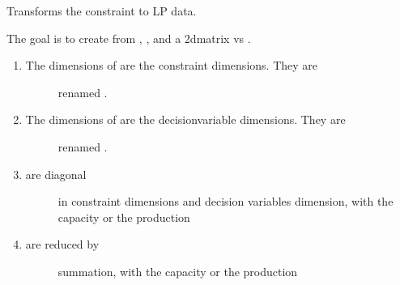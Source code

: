 \documentclass[letterpaper,10pt,english]{sphinxmanual}
\begin{document}
\begin{fulllineitems}
\label{\detokenize{api:muse.constraints.lp_constraint}}
Transforms the constraint to LP data.

The goal is to create from , , and
 a 2d\sphinxhyphen{}matrix  vs .
\begin{enumerate}
%
\item {} \begin{description}
\item[{The dimensions of  are the constraint dimensions. They are}] \leavevmode
renamed .

\end{description}

\item {} \begin{description}
\item[{The dimensions of  are the decision\sphinxhyphen{}variable dimensions. They are}] \leavevmode
renamed .

\end{description}

\item {} \begin{description}
\item[{ are diagonal}] \leavevmode
in constraint dimensions and decision variables dimension, with  the
capacity or the production

\end{description}

\item {} \begin{description}
\item[{ are reduced by}] \leavevmode
summation, with  the capacity or the production


\end{description}
\end{enumerate}
\end{fulllineitems}
\end{document}
